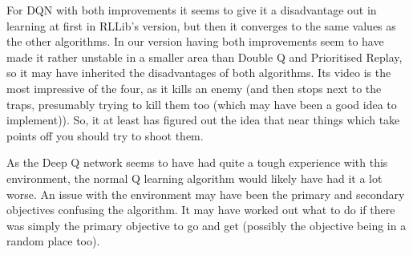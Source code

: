 \documentclass[a4pape, 11pt, english]{article}
\begin{document}

For DQN with both improvements it seems to give it a disadvantage out in learning at first in RLLib's version, but then it converges to the same values as the other algorithms. In our version having both improvements seem to have made it rather unstable in a smaller area than Double Q and Prioritised Replay, so it may have inherited the disadvantages of both algorithms. Its video is the most impressive of the four, as it kills an enemy (and then stops next to the traps, presumably trying to kill them too (which may have been a good idea to implement)). So, it at least has figured out the idea that near things which take points off you should try to shoot them.

As the Deep Q network seems to have had quite a tough experience with this environment, the normal Q learning algorithm would likely have had it a lot worse. An issue with the environment may have been the primary and secondary objectives confusing the algorithm. It may have worked out what to do if there was simply the primary objective to go and get (possibly the objective being in a random place too).
\end{document}
